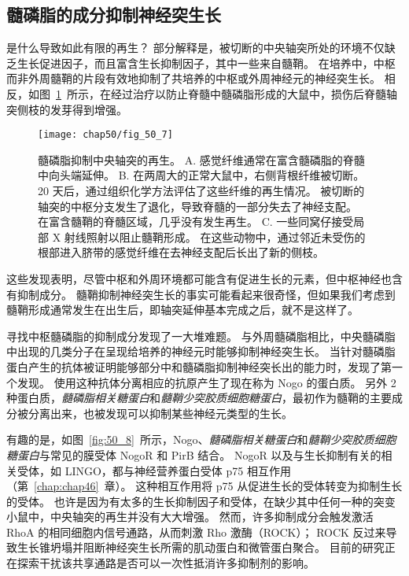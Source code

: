 \subsection{髓磷脂的成分抑制神经突生长}

是什么导致如此有限的再生？
部分解释是，被切断的中央轴突所处的环境不仅缺乏生长促进因子，而且富含生长抑制因子，其中一些来自髓鞘。
在培养中，中枢而非外周髓鞘的片段有效地抑制了共培养的中枢或外周神经元的神经突生长。
相反，如图~\ref{fig:50_7}~所示，在经过治疗以防止脊髓中髓磷脂形成的大鼠中，损伤后脊髓轴突侧枝的发芽得到增强。


\begin{figure}[htbp]
	\centering
	\texttt{[image: chap50/fig\_50\_7]}
	\caption{髓磷脂抑制中央轴突的再生\cite{schwegler1995increased}。
		A. 感觉纤维通常在富含髓磷脂的脊髓中向头端延伸。
		B. 在两周大的正常大鼠中，右侧背根纤维被切断。
		20 天后，通过组织化学方法评估了这些纤维的再生情况。
		被切断的轴突的中枢分支发生了退化，导致脊髓的一部分失去了神经支配。
		在富含髓鞘的脊髓区域，几乎没有发生再生。
		C. 一些同窝仔接受局部 X 射线照射以阻止髓鞘形成。
		在这些动物中，通过邻近未受伤的根部进入脐带的感觉纤维在去神经支配后长出了新的侧枝。}
	\label{fig:50_7}
\end{figure}


这些发现表明，尽管中枢和外周环境都可能含有促进生长的元素，但中枢神经也含有抑制成分。
髓鞘抑制神经突生长的事实可能看起来很奇怪，但如果我们考虑到髓鞘形成通常发生在出生后，即轴突延伸基本完成之后，就不是这样了。


寻找中枢髓磷脂的抑制成分发现了一大堆难题。
与外周髓磷脂相比，中央髓磷脂中出现的几类分子在呈现给培养的神经元时能够抑制神经突生长。
当针对髓磷脂蛋白产生的抗体被证明能够部分中和髓磷脂抑制神经突长出的能力时，发现了第一个发现。
使用这种抗体分离相应的抗原产生了现在称为 Nogo 的蛋白质。
另外 2 种蛋白质，\textit{髓磷脂相关糖蛋白}和\textit{髓鞘少突胶质细胞糖蛋白}，最初作为髓鞘的主要成分被分离出来，也被发现可以抑制某些神经元类型的生长。


有趣的是，如图~\ref{fig:50_8}~所示，Nogo、\textit{髓磷脂相关糖蛋白}和\textit{髓鞘少突胶质细胞糖蛋白}与常见的膜受体 NogoR 和 PirB 结合。
NogoR 以及与生长抑制有关的相关受体，如 LINGO，都与神经营养蛋白受体 p75 相互作用（第~\ref{chap:chap46}~章）。
这种相互作用将 p75 从促进生长的受体转变为抑制生长的受体。
也许是因为有太多的生长抑制因子和受体，在缺少其中任何一种的突变小鼠中，中央轴突的再生并没有大大增强。
然而，许多抑制成分会触发激活 RhoA 的相同细胞内信号通路，从而刺激 Rho 激酶（ROCK）；
ROCK 反过来导致生长锥坍塌并阻断神经突生长所需的肌动蛋白和微管蛋白聚合。
目前的研究正在探索干扰该共享通路是否可以一次性抵消许多抑制剂的影响。


